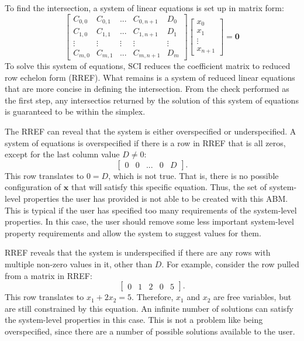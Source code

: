 To find the intersection, a system of linear equations is set up in matrix form:
\[  \left[ \begin{array}{ccccc}
C_{0,0} & C_{0, 1} & ... & C_{0,n+1} & D_0 \\
C_{1,0} & C_{1, 1} & ... & C_{1,n+1} & D_1 \\
\vdots  & \vdots   & \vdots & \vdots & \vdots \\
C_{m,0} & C_{m, 1} & ... & C_{m, n+1} & D_m \end{array} \right]
\left[ \begin{array}{c}
x_0 \\
x_1 \\
\vdots \\
x_{n+1} \end{array} \right] = \mathbf 0
\] 
To solve this system of equations, SCI reduces the coefficient matrix to reduced row echelon form (RREF).
What remains is a system of reduced linear equations that are more concise in defining the intersection.
From the check performed as the first step, any intersectios returned by the solution of this system of equations is guaranteed to be within the simplex.


The RREF can reveal that the system is either overspecified or underspecified.
A system of equations is overspecified if there is a row in RREF that is all zeros, except for the last column value $D \neq 0$:
\[ \left[ \begin{array}{ccccc} 0 & 0 & ... & 0 & D \end{array} \right]. \]
This row translates to $0 = D$, which is not true.
That is, there is no possible configuration of $\mathbf x$ that will satisfy this specific equation.
Thus, the set of system-level properties the user has provided is not able to be created with this ABM.
This is typical if the user has specified too many requirements of the system-level properties.
In this case, the user should remove some less important system-level property requirements and allow the system to suggest values for them.

RREF reveals that the system is underspecified if there are any rows with multiple non-zero values in it, other than $D$. For example, consider the row pulled from a matrix in RREF:
\[ \left[ \begin{array}{ccccc} 0 & 1 & 2 & 0 & 5 \end{array} \right]. \]
This row translates to $x_1 + 2x_2 = 5$.
Therefore, $x_1$ and $x_2$ are free variables, but are still constrained by this equation.
An infinite number of solutions can satisfy the system-level properties in this case.
This is not a problem like being overspecified, since there are a number of possible solutions available to the user.



